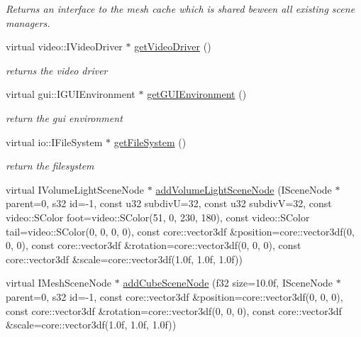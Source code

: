 \begin{DoxyCompactItemize}
\begin{DoxyCompactList}\small\item\em Returns an interface to the mesh cache which is shared beween all existing scene managers. \end{DoxyCompactList}\item 
\hypertarget{classirr_1_1scene_1_1_c_scene_manager_a2d746f68500c4aa2c5bd77ac2ae438a9}{virtual video\-::\-I\-Video\-Driver $\ast$ \hyperlink{classirr_1_1scene_1_1_c_scene_manager_a2d746f68500c4aa2c5bd77ac2ae438a9}{get\-Video\-Driver} ()}\label{classirr_1_1scene_1_1_c_scene_manager_a2d746f68500c4aa2c5bd77ac2ae438a9}

\begin{DoxyCompactList}\small\item\em returns the video driver \end{DoxyCompactList}\item 
virtual gui\-::\-I\-G\-U\-I\-Environment $\ast$ \hyperlink{classirr_1_1scene_1_1_c_scene_manager_a279172e9c8035c9130525d1cf616cd6b}{get\-G\-U\-I\-Environment} ()
\begin{DoxyCompactList}\small\item\em return the gui environment \end{DoxyCompactList}\item 
virtual io\-::\-I\-File\-System $\ast$ \hyperlink{classirr_1_1scene_1_1_c_scene_manager_a6a90a12f000d4caf2ca512a73a6bd47d}{get\-File\-System} ()
\begin{DoxyCompactList}\small\item\em return the filesystem \end{DoxyCompactList}\item 
virtual I\-Volume\-Light\-Scene\-Node $\ast$ \hyperlink{classirr_1_1scene_1_1_c_scene_manager_af7d98342a07da1787595bf4a98f20342}{add\-Volume\-Light\-Scene\-Node} (I\-Scene\-Node $\ast$parent=0, s32 id=-\/1, const u32 subdiv\-U=32, const u32 subdiv\-V=32, const video\-::\-S\-Color foot=video\-::\-S\-Color(51, 0, 230, 180), const video\-::\-S\-Color tail=video\-::\-S\-Color(0, 0, 0, 0), const core\-::vector3df \&position=core\-::vector3df(0, 0, 0), const core\-::vector3df \&rotation=core\-::vector3df(0, 0, 0), const core\-::vector3df \&scale=core\-::vector3df(1.\-0f, 1.\-0f, 1.\-0f))
\item 
virtual I\-Mesh\-Scene\-Node $\ast$ \hyperlink{classirr_1_1scene_1_1_c_scene_manager_ad7a54d667205735a2d599ee3369860eb}{add\-Cube\-Scene\-Node} (f32 size=10.\-0f, I\-Scene\-Node $\ast$parent=0, s32 id=-\/1, const core\-::vector3df \&position=core\-::vector3df(0, 0, 0), const core\-::vector3df \&rotation=core\-::vector3df(0, 0, 0), const core\-::vector3df \&scale=core\-::vector3df(1.\-0f, 1.\-0f, 1.\-0f))

\end{DoxyCompactItemize}
